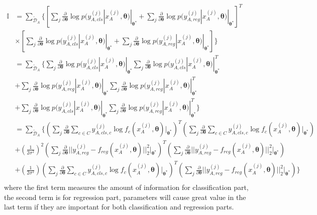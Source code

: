 \documentclass{article}
\begin{document}
\begin{equation}
\begin{split}
\mathbb{I} 
&= \sum_{\tilde{\mathcal D}_A}  \{
[\sum_j \frac{\partial}{\partial \boldsymbol{\theta}}
\log p(y_{A, cls}^{(j)}|x_A^{(j)}, \boldsymbol{\theta})|_{\boldsymbol{\theta^*}}
+\sum_j \frac{\partial}{\partial \boldsymbol{\theta}}
\log p(y_{A, reg}^{(j)}|x_A^{(j)}, \boldsymbol{\theta})|_{\boldsymbol{\theta^*}}]^T \\
&\times[\sum_j \frac{\partial}{\partial \boldsymbol{\theta}}
\log p(y_{A, cls}^{(j)}|x_A^{(j)}, \boldsymbol{\theta})|_{\boldsymbol{\theta^*}}
+ \sum_j \frac{\partial}{\partial \boldsymbol{\theta}}
\log p(y_{A, reg}^{(j)}|x_A^{(j)}, \boldsymbol{\theta})|_{\boldsymbol{\theta^*}}]\} \\
&= \sum_{\tilde{\mathcal D}_A} \{\sum_j \frac{\partial}{\partial \boldsymbol{\theta}}
\log p(y_{A, cls}^{(j)}|x_A^{(j)}, \boldsymbol{\theta})|_{\boldsymbol{\theta^*}}
\sum_j \frac{\partial}{\partial \boldsymbol{\theta}}
\log p(y_{A, cls}^{(j)}|x_A^{(j)}, \boldsymbol{\theta})|_{\boldsymbol{\theta^*}}^T \\
&+ \sum_j \frac{\partial}{\partial \boldsymbol{\theta}}
\log p(y_{A, reg}^{(j)}|x_A^{(j)}, \boldsymbol{\theta})|_{\boldsymbol{\theta^*}}
\sum_j \frac{\partial}{\partial \boldsymbol{\theta}}
\log p(y_{A, reg}^{(j)}|x_A^{(j)}, \boldsymbol{\theta})|_{\boldsymbol{\theta^*}}^T \\
&+\sum_j\frac{\partial}{\partial \boldsymbol{\theta}}
\log p(y_{A, cls}^{(j)}|x_A^{(j)}, \boldsymbol{\theta})|_{\boldsymbol{\theta^*}}
\sum_j\frac{\partial}{\partial \boldsymbol{\theta}}
\log p(y_{A, reg}^{(j)}|x_A^{(j)}, \boldsymbol{\theta})|_{\boldsymbol{\theta^*}}^T\} \\
&= \sum_{\tilde{\mathcal D}_A} \{
(\sum_j \frac{\partial}{\partial \boldsymbol{\theta}}\sum_{c\in C} y_{A,cls,c}^{(j)}\log f_c(x_{A}^{(j)}, \boldsymbol{\theta}) |_{\boldsymbol{\theta^*}})^T
(\sum_j \frac{\partial}{\partial \boldsymbol{\theta}}\sum_{c\in C} y_{A,cls,c}^{(j)}\log f_c(x_{A}^{(j)}, \boldsymbol{\theta}) |_{\boldsymbol{\theta^*}}) \\
&+ (\frac{1}{2\sigma^2})^2 (\sum_j \frac{\partial}{\partial \boldsymbol{\theta}}
||y_{A,reg}^{(j)} - f_{reg}(x_A^{(j)}, \boldsymbol{\theta})||_2^2|_{\boldsymbol{\theta^*}})^T
( \sum_j \frac{\partial}{\partial \boldsymbol{\theta}}
||y_{A,reg}^{(j)} - f_{reg}(x_A^{(j)}, \boldsymbol{\theta})||_2^2|_{\boldsymbol{\theta^*}}) \\
&+ (\frac{1}{2\sigma^2}) (\sum_j\frac{\partial}{\partial \boldsymbol{\theta}}\sum_{c\in C} y_{A,cls,c}^{(j)}\log f_c(x_{A}^{(j)}, \boldsymbol{\theta}) |_{\boldsymbol{\theta^*}})^T
(\sum_j\frac{\partial}{\partial \boldsymbol{\theta}}
||y_{A,reg}^{(j)} - f_{reg}(x_A^{(j)}, \boldsymbol{\theta})||_2^2|_{\boldsymbol{\theta^*}})\} \\
\end{split}
\end{equation}
where the first term measures the amount of information for classification part,
the second term is for regression part,
parameters will cause great value in the last term if they are important
for both classification and regression parts.
\end{document}
